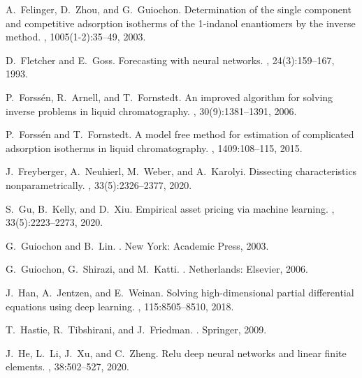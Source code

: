 \documentclass[thmsa,onecolumn,12pt]{article}%
\begin{document}
\begin{thebibliography}{99}
A.~Felinger, D.~Zhou, and G.~Guiochon.
\newblock Determination of the single component and competitive adsorption
  isotherms of the 1-indanol enantiomers by the inverse method.
, 1005(1-2):35--49, 2003.

D.~Fletcher and E.~Goss.
\newblock Forecasting with neural networks.
, 24(3):159--167, 1993.

P.~Forss\'{e}n, R.~Arnell, and T.~Fornstedt.
\newblock An improved algorithm for solving inverse problems in liquid
  chromatography.
, 30(9):1381--1391, 2006.

P.~Forss\'{e}n and T.~Fornstedt.
\newblock A model free method for estimation of complicated adsorption
  isotherms in liquid chromatography.
, 1409:108--115, 2015.

J.~Freyberger, A.~Neuhierl, M.~Weber, and A.~Karolyi.
\newblock Dissecting characteristics nonparametrically.
, 33(5):2326--2377, 2020.

S.~Gu, B.~Kelly, and D.~Xiu.
\newblock Empirical asset pricing via machine learning.
, 33(5):2223--2273, 2020.

G.~Guiochon and B.~Lin.
.
\newblock New York: Academic Press, 2003.

G.~Guiochon, G.~Shirazi, and M.~Katti.
.
\newblock Netherlands: Elsevier, 2006.

J.~Han, A.~Jentzen, and E.~Weinan.
\newblock Solving high-dimensional partial differential equations using deep
  learning.
, 115:8505--8510, 2018.

T.~Hastie, R.~Tibshirani, and J.~Friedman.
.
\newblock Springer, 2009.

J.~He, L.~Li, J.~Xu, and C.~Zheng.
\newblock Relu deep neural networks and linear finite elements.
, 38:502--527, 2020.


\end{thebibliography}
\end{document}
